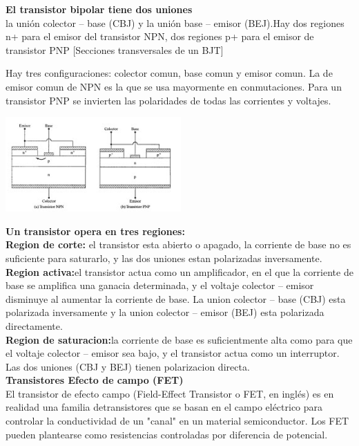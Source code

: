 \documentclass[10pt,a4paper]{article}
\begin{document}
\textbf{El transistor bipolar tiene dos uniones}\\
la unión colector – base (CBJ) y la unión base – emisor (BEJ).Hay dos regiones n+  para el emisor del transistor NPN, dos regiones  p+ para el emisor de transistor PNP [Secciones transversales de un BJT]

Hay tres configuraciones: colector comun, base comun y emisor comun. La de emisor comun de NPN es la que se usa mayormente en conmutaciones. Para un transistor PNP se invierten las polaridades de todas las corrientes y voltajes.\\

\begin{center}
\includegraphics[scale=0.8]{2.png}
\end{center} 

\textbf{Un transistor opera en tres regiones:}\\
\textbf{Region de corte:} el transistor esta abierto o apagado, la corriente de base no es suficiente para saturarlo, y las dos uniones estan polarizadas inversamente.\\
\textbf{Region activa:}el transistor actua como un amplificador, en el que la corriente de base se amplifica una ganacia determinada, y el voltaje colector – emisor disminuye al aumentar la corriente de base. La union colector – base (CBJ) esta polarizada inversamente y la union colector – emisor (BEJ) esta polarizada directamente.\\
\textbf{Region de saturacion:}la corriente de base es suficientmente alta como para que el voltaje colector – emisor sea bajo, y el transistor actua como un interruptor. Las dos uniones (CBJ y BEJ) tienen polarizacion directa.\\ 
\textbf{Transistores  Efecto de campo (FET)}\\
El transistor de efecto campo (Field-Effect Transistor o FET, en inglés) es en realidad una familia detransistores que se basan en el campo eléctrico para controlar la conductividad de un "canal" en un material semiconductor. Los FET pueden plantearse como resistencias controladas por diferencia de potencial.\\
\end{document}
